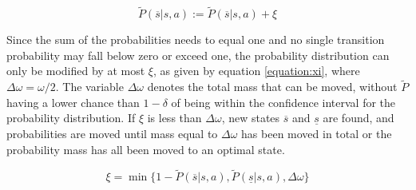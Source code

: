 \begin{equation}
\label{equation:ptilde_roof}
\tilde{P}(\overline{s}|s,a) := \tilde{P}(\overline{s}|s,a)+\xi
\end{equation}

Since the sum of the probabilities needs to equal one and 
no single transition probability may fall below zero or exceed one, the probability distribution can only be modified by at most $\xi$, as given by
equation \eqref{equation:xi}, where $\Delta\omega = \omega / 2$. The variable $\Delta\omega$ denotes the total mass that can be moved, without $\tilde{P}$ having a lower chance than $1 - \delta$ of being within the confidence interval for the probability distribution. If $\xi$ is less than $\Delta \omega$, new states
$\overline{s}$ and $\underline{s}$ are found, and probabilities are moved until
mass equal to $\Delta \omega$ has been moved in total or the probability mass has all been moved to an optimal state. 

\begin{equation}
\label{equation:xi}
\xi = \min\{
  1 - \tilde{P}(\overline{s} | s, a)
  , \tilde{P}(\underline{s} | s, a)
  , \Delta \omega 
\}
\end{equation}
